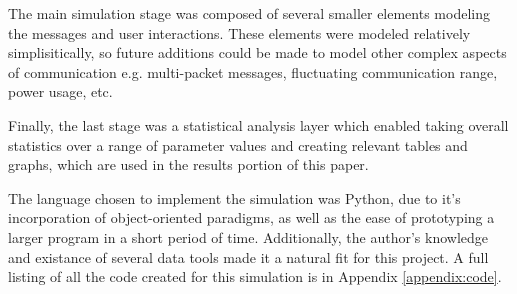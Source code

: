 The main simulation stage was composed of several smaller elements modeling
the messages and user interactions.
These elements were modeled relatively simplisitically, so future additions could be
made to model other complex aspects of communication e.g. multi-packet messages,
fluctuating communication range, power usage, etc.

Finally, the last stage was a statistical analysis layer which enabled taking overall
statistics over a range of parameter values and creating relevant tables and graphs,
which are used in the results portion of this paper.

The language chosen to implement the simulation was Python, due to it's incorporation of 
object-oriented paradigms, as well as the ease of prototyping a larger program in a 
short period of time.
Additionally, the author's knowledge and existance of several data tools made it a natural
fit for this project.
A full listing of all the code created for this simulation is in Appendix \ref{appendix:code}.
